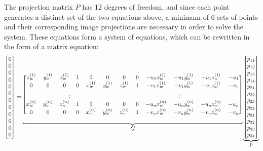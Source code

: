 The projection matrix $P$ has 12 degrees of freedom, and since each point generates a distinct set of the two equations above, a minimum of 6 sets of points and their corresponding image projections are necessary in order to solve the system. These equations form a system of equations, which can be rewritten in the form of a matrix equation:
\setcounter{MaxMatrixCols}{20}
\begin{equation}
    \scalemath{0.9}{
    \begin{bmatrix}
        0 \\ 0 \\ 0 \\ 0 \\ 0 \\ 0 \\ 0 \\ 0 \\ 0 \\ 0 \\ 0 \\ 0
    \end{bmatrix}
    =
    \underbrace{
        \begin{blockarray}{[*{12}c]}
            x_w^{(1)} & y_w^{(1)} & z_w^{(1)} & 1 & 0         & 0         & 0         & 0 & -u_1 x_w^{(1)} & -u_1 y_w^{(1)} & -u_1 z_w^{(1)} & -u_1 \\
            0         & 0         & 0         & 0 & x_w^{(1)} & y_w^{(1)} & z_w^{(1)} & 1 & -v_1 x_w^{(1)} & -v_1 y_w^{(1)} & -v_1 z_w^{(1)} & -v_1 \\
            \BAmulticolumn{6}{c}{\vdots} & \BAmulticolumn{6}{c}{\vdots} \\
            x_w^{(n)} & y_w^{(n)} & z_w^{(n)} & 1 & 0         & 0         & 0         & 0 & -u_n x_w^{(n)} & -u_n y_w^{(n)} & -u_n z_w^{(n)} & -u_n \\
            0         & 0         & 0         & 0 & x_w^{(n)} & y_w^{(n)} & z_w^{(n)} & 1 & -v_n x_w^{(n)} & -v_n y_w^{(n)} & -v_n z_w^{(n)} & -v_n
        \end{blockarray}
    }_{\mathlarger{G}}
    \underbrace{
        \begin{bmatrix}
            p_{11} \\ p_{12} \\ p_{13} \\ p_{14} \\ p_{21} \\ p_{22} \\ p_{23} \\ p_{24} \\ p_{31} \\ p_{32} \\ p_{33} \\ p_{34}
        \end{bmatrix}
    }_{\mathlarger{p}}
    }
\end{equation}
